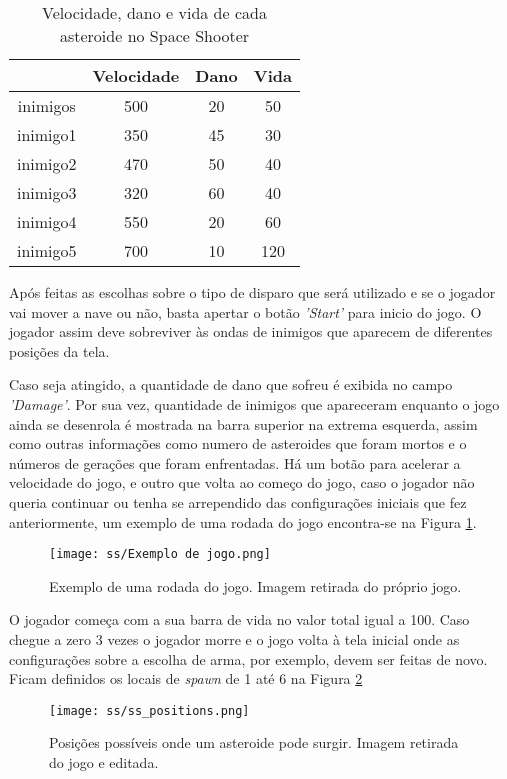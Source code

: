\begin{table}[H]
\caption{Velocidade, dano e vida de cada asteroide no Space Shooter}
\begin{tabular}{c|ccc}
         & Velocidade & Dano & Vida   \\ \hline
inimigos & 500        & 20     &   50     \\
inimigo1 & 350        & 45     &   30     \\
inimigo2 & 470        & 50     &   40     \\
inimigo3 & 320        & 60     &   40     \\
inimigo4 & 550        & 20     &   60     \\
inimigo5 & 700        & 10     &   120      
\end{tabular}
\label{tab:ss-ast-dmg}
\end{table}

Após feitas as escolhas sobre o tipo de disparo que será utilizado e se o jogador vai mover a nave ou não, basta apertar o botão \textit{'Start'} para inicio do jogo. O jogador assim deve sobreviver às ondas de inimigos que aparecem de diferentes posições da tela. 

Caso seja atingido, a quantidade de dano que sofreu é exibida no campo \textit{'Damage'}. Por sua vez, quantidade de inimigos que apareceram enquanto o jogo ainda se desenrola é mostrada na barra superior na extrema esquerda, assim como outras informações como numero de asteroides que foram mortos e o números de gerações que foram enfrentadas. Há um botão para acelerar a velocidade do jogo, e outro que volta ao começo do jogo, caso o jogador não queria continuar ou tenha se arrependido das configurações iniciais que fez anteriormente, um exemplo de uma rodada do jogo encontra-se na Figura \ref{fig:ss-exemplo}.

\begin{figure}
  \centering
  \texttt{[image: ss/Exemplo de jogo.png]}
  \caption{Exemplo de uma rodada do jogo. Imagem retirada do próprio jogo.\label{fig:ss-exemplo}}
\end{figure}

O jogador começa com a sua barra de vida no valor total igual a 100. Caso chegue a zero 3 vezes o jogador morre e o jogo volta à tela inicial onde as configurações sobre a escolha de arma, por exemplo, devem ser feitas de novo. Ficam definidos os locais de \textit{spawn} de 1 até 6 na Figura \ref{fig:ss-positions}

\begin{figure}
  \centering
  \texttt{[image: ss/ss\_positions.png]}
  \caption{Posições possíveis onde um asteroide pode surgir. Imagem retirada do jogo e editada.\label{fig:ss-positions}}
\end{figure}